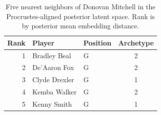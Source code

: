 \begin{table}[htbp]
  \centering\small
  \begin{tabular}{rllc}
    \toprule
    Rank & Player & Position & Archetype \\
    \midrule
    1 & Bradley Beal & G & 2 \\
    2 & De'Aaron Fox & G & 2 \\
    3 & Clyde Drexler & G & 1 \\
    4 & Kemba Walker & G & 2 \\
    5 & Kenny Smith & G & 1 \\
    \bottomrule
  \end{tabular}
  \caption{Five nearest neighbors of Donovan Mitchell in the Procrustes-aligned posterior latent space. Rank is by posterior mean embedding distance.}
  \label{tab:Donovan_Mitchell_neighbors}
\end{table}


